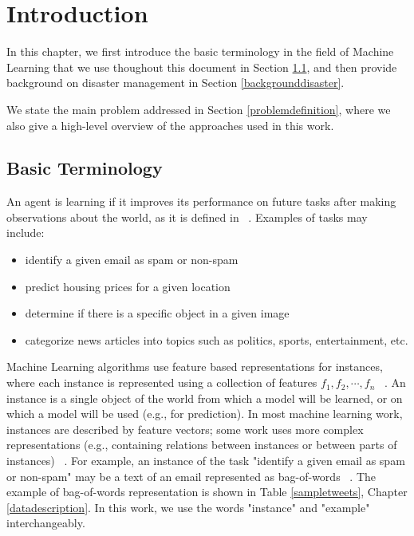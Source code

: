 \cleardoublepage

\chapter{Introduction}
\label{introduction}

In this chapter, we first introduce the basic terminology in the field of Machine Learning that we use thoughout this document in Section \ref{basicterminology}, and then provide background on disaster management in Section \ref{backgrounddisaster}.

We state the main problem addressed in Section \ref{problemdefinition}, where we also give a high-level overview of the approaches used in this work. 

\section{Basic Terminology}
\label{basicterminology}

An agent is learning if it improves its performance on future tasks after making observations
about the world, as it is defined in ~\citep{rn}. Examples of tasks may include: 
\begin{itemize}
  \item identify a given email as spam or non-spam
  \item predict housing prices for a given location
  \item determine if there is a specific object in a given image
  \item categorize news articles into topics such as politics, sports, entertainment, etc.
\end{itemize}

Machine Learning algorithms use feature based representations for instances, where each instance is represented using a collection of features $f_1,f_2,\cdots,f_n$ ~\citep{tom}. An instance is a single object of the world from which a model will be learned, or on which a model will be used (e.g., for prediction). In most machine learning work, instances are described by feature vectors; some work uses more complex representations (e.g., containing relations between instances or between parts of instances) ~\citep{terms}. For example, an instance of the task "identify a given email as spam or non-spam" may be a text of an email represented as bag-of-words ~\citep{tom}. The example of bag-of-words representation is shown in Table \ref{sampletweets}, Chapter \ref{datadescription}. In this work, we use the words "instance" and "example" interchangeably. 

